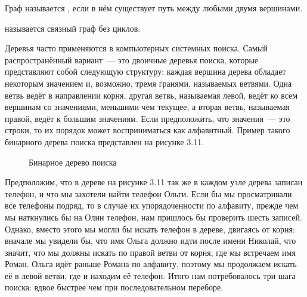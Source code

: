\begin{definition}
Граф называется , если в нём существует путь между любыми двумя вершинами.
\end{definition}

\begin{definition}
 называется связный граф без циклов.
\end{definition}

Деревья часто применяются в компьютерных системных поиска. Самый распространённый вариант~— это двоичные деревья поиска, которые представляют собой следующую структуру: каждая вершина дерева обладает некоторым значением и, возможно, тремя гранями, называемых ветвями. Одна ветвь ведёт в направлении корня, другая ветвь, называемая левой, ведёт ко всем вершинам со значениями, меньшими чем текущее, а вторая ветвь, называемая правой, ведёт к большим значениям. Если предположить, что значения~— это строки, то их порядок может восприниматься как алфавитный. Пример такого бинарного дерева поиска представлен на рисунке 3.11.


\begin{figure}[h]
\centering
{}
\caption{Бинарное дерево поиска}
\end{figure}

Предположим, что в дереве на рисунке 3.11 так же в каждом узле дерева записан телефон, и что мы захотели найти телефон Ольги. Если бы мы просматривали все телефоны подряд, то в случае их упорядоченности по алфавиту, прежде чем мы наткнулись бы на Олин телефон, нам пришлось бы проверить шесть записей. Однако, вместо этого мы могли бы искать телефон в дереве, двигаясь от корня: вначале мы увидели бы, что имя Ольга должно идти после имени Николай, что значит, что мы должны искать по правой ветви от корня, где мы встречаем имя Роман. Ольга идёт раньше Романа по алфавиту, поэтому мы продолжаем искать её в левой ветви, где и находим её телефон. Итого нам потребовалось три шага поиска: вдвое быстрее чем при последовательном переборе.

